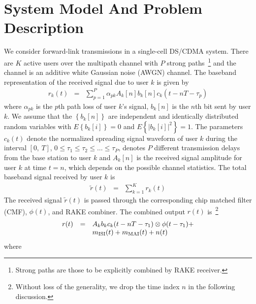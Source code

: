 \documentclass[a4paper,10pt,fleqn, twocolumn]{IEEETran}
\begin{document}
\section{System Model And Problem Description}
We consider forward-link transmissions in a single-cell DS/CDMA
system. There are $K$ active users over the multipath channel with
$P$ strong paths~\footnote{Strong paths are those to be explicitly
combined by RAKE receiver.} and the channel is an additive white
Gaussian noise (AWGN) channel. The baseband representation of the
received signal due to user $k$ is given by
\begin{equation}
\begin{array}{rcl}
r_k(t)&=&\sum\limits_{p=1}^{P}\alpha_{pk}A_k[n]
b_k[n]c_k(t-nT-\tau_p)
\end{array}
\end{equation}
\noindent where $\alpha_{pk}$ is the $p$th path loss of user $k$'s
signal, $b_k{[n]}$ is the $n$th bit sent by user $k$. We assume
that the $\left\{b_k{[n]}\right\}$ are independent and identically
distributed random variables with $E\left\{b_k{[i]}\right\}=0$ and
$E\left\{|b_k{[i]}|^2\right\}=1$. The parameters $c_k(t)$ denote
the normalized spreading signal waveform of user $k$ during the
interval $[0,\ T]$, $0\leq\tau_1\leq\tau_2\leq\ldots\leq\tau_P$,
denotes $P$ different transmission delays from the base station to
user $k$ and $A_k[n]$ is the received signal amplitude for user
$k$ at time $t=n$, which depends on the possible channel
statistics. The total baseband signal received by user $k$ is
\begin{equation}
\begin{array}{rcl}
\tilde{r}(t)&=&\sum\limits_{k=1}^{K}r_k(t)
\end{array}
\end{equation}
The received signal $\tilde{r}(t)$ is passed through the
corresponding chip matched filter (CMF), $\phi(t)$, and RAKE
combiner. The combined output $r(t)$ is~\footnote{Without loss of
the generality, we drop the time index $n$ in the following
discussion.}
\begin{equation}\hspace{-0.0in}
\begin{array}{rcl}
r(t)&=&A_k b_k c_k(t-nT-\tau_1)\otimes \phi(t-\tau_1)+ \\
&&\hspace{0.0in} m_{\rm ISI}(t) + m_{\rm MAI}(t) + n(t)
\end{array}\label{r_t}
\end{equation}
\noindent where
\end{document}
